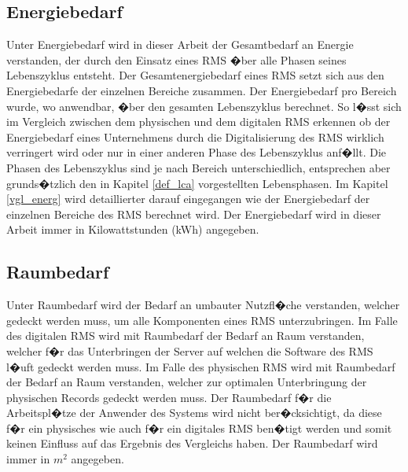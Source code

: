 \documentclass[a4paper,twoside,10pt]{report}
\begin{document}
\subsection{Energiebedarf}\label{subsec:defenergieverbrauch}
Unter Energiebedarf wird in dieser Arbeit der Gesamtbedarf an Energie verstanden, der durch den Einsatz eines \ac{RMS} �ber alle Phasen seines Lebenszyklus entsteht. Der Gesamtenergiebedarf eines \ac{RMS} setzt sich aus den Energiebedarfe der einzelnen Bereiche zusammen. Der Energiebedarf pro Bereich wurde, wo anwendbar, �ber den gesamten Lebenszyklus berechnet. So l�sst sich im Vergleich zwischen dem physischen und dem digitalen \ac{RMS} erkennen ob der Energiebedarf eines Unternehmens durch die Digitalisierung des \ac{RMS} wirklich verringert wird oder nur in einer anderen Phase des Lebenszyklus anf�llt. Die Phasen des Lebenszyklus sind je nach Bereich unterschiedlich, entsprechen aber grunds�tzlich den in Kapitel \ref{def_lca} vorgestellten Lebensphasen. Im Kapitel \ref{vgl_energ} wird detaillierter darauf eingegangen wie der Energiebedarf der einzelnen Bereiche des \ac{RMS} berechnet wird. Der Energiebedarf wird in dieser Arbeit immer in Kilowattstunden (kWh) angegeben. 

\subsection{Raumbedarf}\label{subsec:defraumbedarf}
Unter Raumbedarf wird der Bedarf an umbauter Nutzfl�che verstanden, welcher gedeckt werden muss, um alle Komponenten eines \ac{RMS} unterzubringen. Im Falle des digitalen \ac{RMS} wird mit Raumbedarf der Bedarf an Raum verstanden, welcher f�r das Unterbringen der Server auf welchen die Software des \ac{RMS} l�uft gedeckt werden muss. Im Falle des physischen \ac{RMS} wird mit Raumbedarf der Bedarf an Raum verstanden, welcher zur optimalen Unterbringung der physischen Records gedeckt werden muss. Der Raumbedarf f�r die Arbeitspl�tze der Anwender des Systems wird nicht ber�cksichtigt, da diese f�r ein physisches wie auch f�r ein digitales \ac{RMS} ben�tigt werden und somit keinen Einfluss auf das Ergebnis des Vergleichs haben. Der Raumbedarf wird immer in $m^2$ angegeben.
\end{document}
